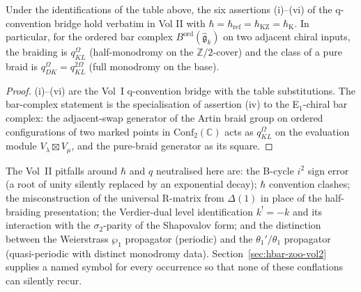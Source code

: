 \begin{theorem}
\label{thm:q-convention-bridge-v2}
Under the identifications of the table above, the six assertions
\textup{(i)--(vi)} of the q-convention bridge hold verbatim in
Vol II with $\hbar = \hbar_{\mathrm{ref}} = \hbar_{\mathrm{KZ}} = \hbar_{\mathrm{K}}$.
In particular, for the ordered bar complex $B^{\mathrm{ord}}(\widehat{\mathfrak{g}}_{k})$
on two adjacent chiral inputs, the braiding is $q_{KL}^{\Omega}$
(half-monodromy on the $\mathbb{Z}/2$-cover) and the class of a pure braid is
$q_{DK}^{\Omega} = q_{KL}^{2\Omega}$ (full monodromy on the base).
\end{theorem}

\begin{proof}
(i)--(vi) are the Vol~I q-convention bridge with the table
substitutions. The bar-complex statement is the specialisation of assertion
(iv) to the E$_{1}$-chiral bar complex: the adjacent-swap generator of the
Artin braid group on ordered configurations of two marked points in
$\mathrm{Conf}_{2}(\mathbb{C})$ acts as $q_{KL}^{\Omega}$ on the evaluation
module $V_{\lambda}\boxtimes V_{\mu}$, and the pure-braid generator as its
square.
\end{proof}

\begin{remark}
The Vol~II pitfalls around $\hbar$ and $q$ neutralised here are: the
B-cycle $i^{2}$ sign error (a root of unity silently
replaced by an exponential decay); $\hbar$ convention clashes; the
misconstruction of the universal R-matrix from $\Delta(1)$ in place of the
half-braiding presentation; the Verdier-dual level identification $k^{!} = -k$
and its interaction with the $\sigma_{2}$-parity of the Shapovalov form; and
the distinction between the Weierstrass $\wp_{1}$ propagator (periodic) and the
$\theta_{1}'/\theta_{1}$ propagator (quasi-periodic with distinct monodromy
data). Section~\ref{sec:hbar-zoo-vol2} supplies a named symbol for every
occurrence so that none of these conflations can silently recur.
\end{remark}
